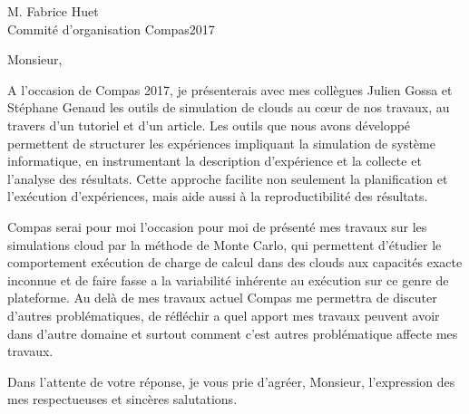 \documentclass{letter}
\begin{document}
\begin{letter}{M. Fabrice Huet \\ Commité d'organisation Compas2017}

\opening{Monsieur,}

	A l'occasion de Compas 2017, je présenterais avec mes collègues Julien
	Gossa et Stéphane Genaud les outils de simulation de clouds au c\oe{}ur
	de nos travaux, au travers d'un tutoriel et d'un article. Les outils que
	nous avons développé permettent de structurer les expériences impliquant
	la simulation de système informatique, en instrumentant la description
	d'expérience et la collecte et l'analyse des résultats. Cette approche
	facilite non seulement la planification et l'exécution d'expériences,
	mais aide aussi à la reproductibilité des résultats. 

	Compas serai pour moi l'occasion pour moi de présenté mes travaux
	sur les simulations cloud par la méthode de Monte Carlo, qui permettent
	d'étudier le comportement exécution de charge de calcul dans des clouds
	aux capacités exacte inconnue et de faire fasse a la variabilité
	inhérente au exécution sur ce genre de plateforme. Au delà de mes travaux
	actuel Compas me permettra de discuter d'autres problématiques, de
	réfléchir a quel apport mes travaux peuvent avoir dans d'autre domaine
	et surtout comment c'est autres problématique affecte mes travaux.

\closing{Dans l'attente de votre réponse, je vous prie d'agréer, Monsieur,
l'expression des mes respectueuses et sincères salutations.}


\end{letter}
\end{document}
